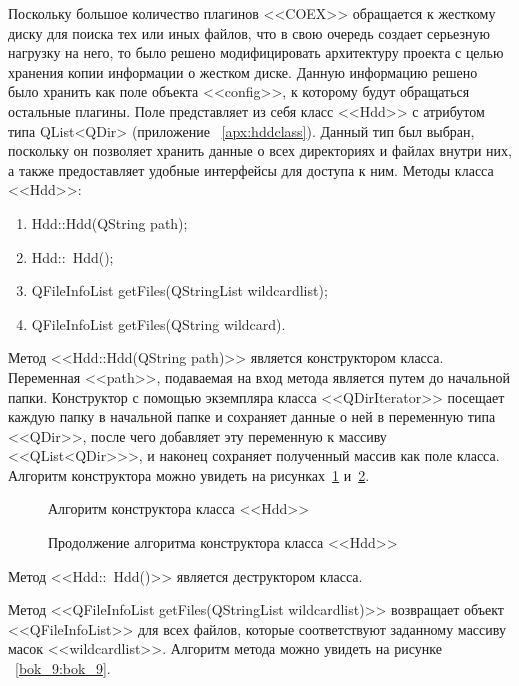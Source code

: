Поскольку большое количество плагинов <<COEX>> обращается к жесткому диску для поиска тех или иных файлов, что в свою очередь создает серьезную нагрузку на него, то было решено модифицировать архитектуру проекта с целью хранения копии информации о жестком диске. Данную информацию решено было хранить как поле объекта <<config>>, к которому будут обращаться остальные плагины. Поле представляет из себя класс <<Hdd>> с атрибутом типа QList<QDir> (приложение ~\ref{apx:hddclass}). Данный тип был выбран, поскольку он позволяет хранить данные о всех директориях и файлах внутри них, а также предоставляет удобные интерфейсы для доступа к ним. Методы класса <<Hdd>>:

\begin{enumerate}
  \item Hdd::Hdd(QString path);
  \item Hdd::~Hdd();
  \item QFileInfoList getFiles(QStringList wildcardlist);
  \item QFileInfoList getFiles(QString wildcard).
\end{enumerate}

Метод <<Hdd::Hdd(QString path)>> является конструктором класса. Переменная <<path>>, подаваемая на вход метода является путем до начальной папки. Конструктор с помощью экземпляра класса <<QDirIterator>> посещает каждую папку в начальной папке и сохраняет данные о ней в переменную типа <<QDir>>, после чего добавляет эту переменную к массиву <<QList<QDir>>>, и наконец сохраняет полученный массив как поле класса. Алгоритм конструктора можно увидеть на рисунках~\ref{bok_6:bok_6} и~\ref{bok_7:bok_7}.

\begin{figure}[!ht]
\caption{ Алгоритм конструктора класса <<Hdd>> }
\label{bok_6:bok_6}
\end{figure}

\begin{figure}[!ht]
\caption{ Продолжение алгоритма конструктора класса <<Hdd>> }
\label{bok_7:bok_7}
\end{figure}

Метод <<Hdd::~Hdd()>> является деструктором класса.

Метод <<QFileInfoList getFiles(QStringList wildcardlist)>> возвращает объект <<QFileInfoList>> для всех файлов, которые соответствуют заданному массиву масок <<wildcardlist>>. Алгоритм метода можно увидеть на рисунке ~\ref{bok_9:bok_9}.


